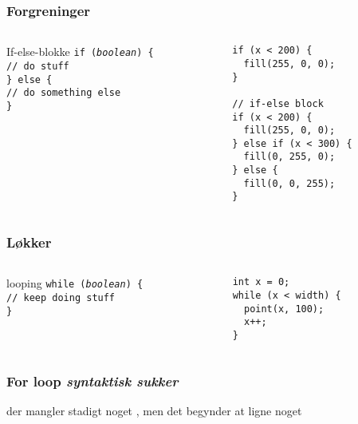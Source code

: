 \documentclass{beamer}
\begin{document}
\begin{frame}[fragile]
  \frametitle{Forgreninger}
  \begin{columns}
    \begin{column}{0.5\textwidth}
      \begin{block}{If-else-blokke}
        \texttt{if (\emph{boolean}) \{ }\\
        \texttt{// do stuff} \\
        \texttt{\} else \{ } \\
        \texttt{// do something else} \\
        \texttt{\}}\\
        \vspace{1cm}
      \end{block}
    \end{column}
    \begin{column}{0.5\textwidth}
\begin{verbatim} 
if (x < 200) {
  fill(255, 0, 0);
}

// if-else block
if (x < 200) {
  fill(255, 0, 0);
} else if (x < 300) {
  fill(0, 255, 0);
} else {
  fill(0, 0, 255);
}
\end{verbatim}
    \end{column}
  \end{columns}
\end{frame}


\begin{frame}[fragile]
  \frametitle{Løkker}
  \begin{columns}
    \begin{column}{0.5\textwidth}
      \begin{block}{looping}
        \texttt{while (\emph{boolean}) \{ }\\
        \texttt{// keep doing stuff} \\
        \texttt{\}}\\
        \vspace{1cm}
      \end{block}
    \end{column}
    \begin{column}{0.5\textwidth}
\begin{verbatim} 
int x = 0;
while (x < width) {
  point(x, 100);
  x++;
}
\end{verbatim}
    \end{column}
  \end{columns}
\end{frame}


\begin{frame}
  \frametitle{For loop \emph{ syntaktisk sukker}}

  der mangler stadigt noget , men det begynder at ligne noget
\end{frame}
\end{document}
